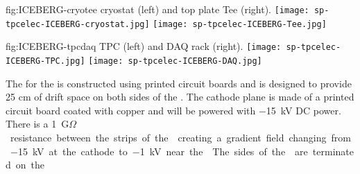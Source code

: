 \begin{dunefigure}
  {fig:ICEBERG-cryotee}
	{ cryostat (left) and top plate Tee (right).}
  \texttt{[image: sp-tpcelec-ICEBERG-cryostat.jpg]}
  \texttt{[image: sp-tpcelec-ICEBERG-Tee.jpg]}
\end{dunefigure}

\begin{dunefigure}
  {fig:ICEBERG-tpcdaq}
	{ TPC (left) and DAQ rack (right).}
  \texttt{[image: sp-tpcelec-ICEBERG-TPC.jpg]}
  \texttt{[image: sp-tpcelec-ICEBERG-DAQ.jpg]}
\end{dunefigure}

The  for the  is constructed using printed circuit boards and is 
designed to provide 25 cm of drift space on both sides of the . The cathode 
plane is made of a printed circuit board coated with copper and will be powered with 
\SI{-15}{kV} DC power. There is a \SI{1}{G$\Omega$} resistance between the strips of the 
creating a gradient field changing from \SI{-15}{kV} at the cathode to \SI{-1}{kV} near the 
. The sides of the  are terminated on the 
